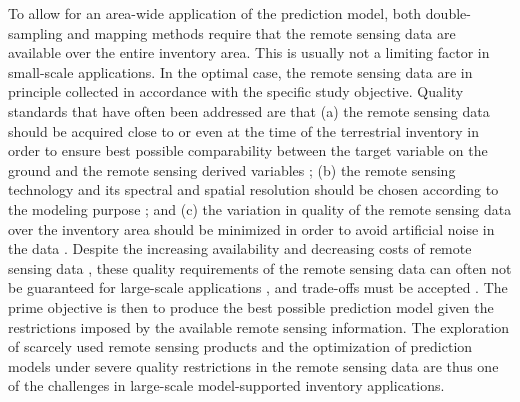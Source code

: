 To allow for an area-wide application of the prediction model, both double-sampling and mapping methods require that the remote sensing data are available over the entire inventory area. This is usually not a limiting factor in small-scale applications. In the optimal case, the remote sensing data are in principle collected in accordance with the specific study objective. Quality standards that have often been addressed are that (a) the remote sensing data should be acquired close to or even at the time of the terrestrial inventory in order to ensure best possible comparability between the target variable on the ground and the remote sensing derived variables \citep{mcroberts2015}; (b) the remote sensing technology and its spectral and spatial resolution should be chosen according to the modeling purpose \citep{kohl2006}; and (c) the variation in quality of the remote sensing data over the inventory area should be minimized in order to avoid artificial noise in the data \citep{naesset2014inmaltamo}. Despite the increasing availability and decreasing costs of remote sensing data \citep{white2016}, these quality requirements of the remote sensing data can often not be guaranteed for large-scale applications \citep{maack2016}, and trade-offs must be accepted \citep{jakubowski2013}. The prime objective is then to produce the best possible prediction model given the restrictions imposed by the available remote sensing information. The exploration of scarcely used remote sensing products and the optimization of prediction models under severe quality restrictions in the remote sensing data are thus one of the challenges in large-scale model-supported inventory applications.\par


